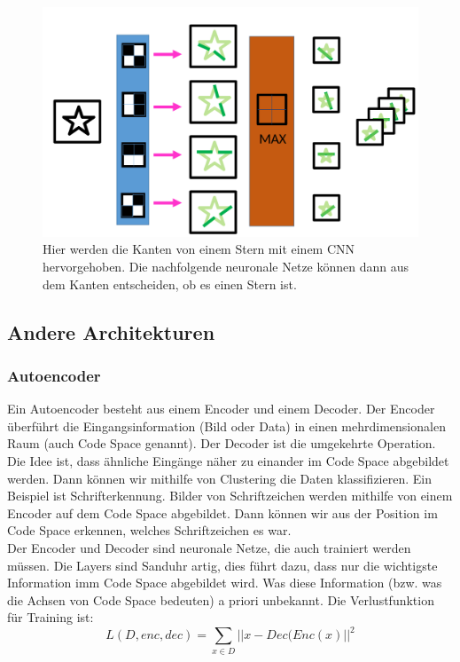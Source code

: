 \begin{figure}[h]
    \centering
    \includegraphics[scale= 0.3]{Figures/ML-conv.png}
    \caption{Hier werden die Kanten von einem Stern mit einem CNN hervorgehoben. Die nachfolgende neuronale Netze können dann aus dem Kanten entscheiden, ob es einen Stern ist.}
    \label{fig:ml-conv}
\end{figure}
\subsection{Andere Architekturen}
\subsubsection{Autoencoder}
Ein Autoencoder besteht aus einem Encoder und einem Decoder. Der Encoder überführt die Eingangsinformation (Bild oder Data) in einen mehrdimensionalen Raum (auch Code Space genannt). Der Decoder ist die umgekehrte Operation. Die Idee ist, dass ähnliche Eingänge näher zu einander im Code Space abgebildet werden. Dann können wir mithilfe von Clustering die Daten klassifizieren. Ein Beispiel ist Schrifterkennung. Bilder von Schriftzeichen werden mithilfe von einem Encoder auf dem Code Space abgebildet. Dann können wir aus der Position im Code Space erkennen, welches Schriftzeichen es war.\\

Der Encoder und Decoder sind neuronale Netze, die auch trainiert werden müssen. Die Layers sind Sanduhr artig, dies führt dazu, dass nur die wichtigste Information imm Code Space abgebildet wird. Was diese Information (bzw. was die Achsen von Code Space bedeuten) a priori unbekannt. Die Verlustfunktion für Training ist:
\begin{equation}
    L(D, enc,dec) = \sum_{x\in D} || x -Dec(Enc(x)||^2
\end{equation}

